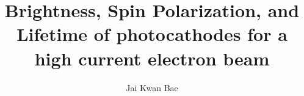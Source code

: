 \title {Brightness, Spin Polarization, and Lifetime of photocathodes for a high current electron beam}
\author {Jai Kwan Bae}
